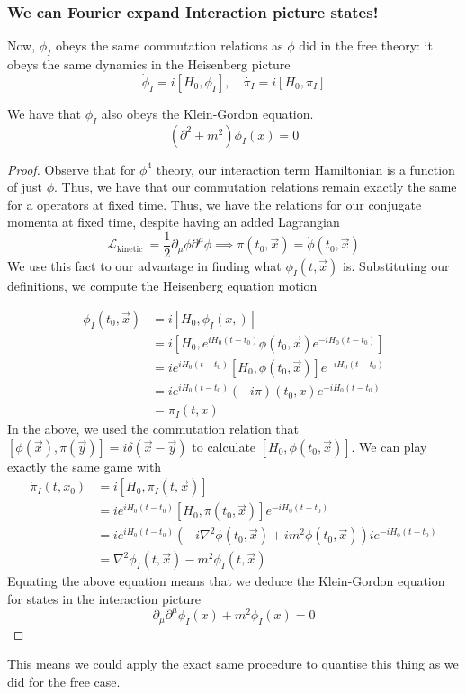 \subsubsection{We can Fourier expand Interaction picture states!} 
Now, $ \phi_ I $ obeys the same commutation relations
as $ \phi $ did in the free theory: it obeys the same dynamics 
in the Heisenberg picture
\[
\dot{ \phi} _ I  = i [ H_0 , \phi_I ], \quad \dot{ \pi_I } = i [ H_0 , \pi_I]  
\] 
\begin{thm}
We have that $ \phi_ I $ also obeys the Klein-Gordon equation. 
\[
( \partial  ^ 2 + m ^ 2 ) \phi_ I ( x) = 0 
\]
\begin{proof}
Observe that for $ \phi ^ 4 $ theory, our interaction term Hamiltonian 
is a function of just $ \phi $. Thus, we have that our commutation relations remain 
exactly the same for a operators at fixed time. Thus, we have the relations for 
our conjugate momenta at fixed time, despite having an added Lagrangian
\[	
\mathcal{ L }_{\text{kinetic }}  = \frac{1}{2 } \partial _\mu \phi \partial  ^\mu \phi \implies \pi ( t_0, \vec{x} )  = \dot{\phi } ( t_0 , \vec{x} )   
\] We use this fact to our advantage in finding what 
$ \phi _ I  ( t, \vec{x} ) $  is. 
Substituting our definitions, we compute the Heisenberg equation motion 

\begin{align*}
\dot{ \phi }_I ( t_0, \vec{x} ) &=  i [ H_0 , \phi_I ( x, ) ]  \\
&=  i [ H_0 , e^{ i H_0 ( t - t_0 )  } \phi ( t_0 , \vec{x} ) e^{ - i H_0 ( t - t_0 ) }]   \\
&= i e^{ i H_0 (  t- t_0 ) } [ H_0 , \phi ( t_0, \vec{x} )  ] e^{ - i H_0 ( t - t_0 ) } \\
&= i e^{ i H_0 ( t - t_0 ) } ( - i  \pi)  ( t_0 , x ) e^{  - i H_0 ( t - t_0 ) } \\
	&=   \pi_ I ( t, x )  
\end{align*} In the above, we used the commutation relation that 
$ [ \phi ( \vec{x} ) , \pi ( \vec{y} ) ] = i \delta ( \vec{x} - \vec{y} ) $ 
to calculate $ [ H_0 , \phi ( t_0 , \vec{x} ) ] $. 
We can play exactly the same game with 
\begin{align*}
\dot{ \pi} _I ( t, x_0 ) &=  i [ H_0 , \pi_I ( t , \vec{x} ) ]  \\
&=  i e^{ i H_0 (  t- t_0 ) } [ H_0 , \pi ( t_0, \vec{x} ) ] e^{  - i H_0 ( t - t_0 ) } \\
&=  i e^{ i H_0 ( t - t_0 ) } ( - i \nabla ^ 2 \phi ( t_0 , \vec{x} ) + i m ^ 2 \phi ( t_0 , \vec{x} ) ) i e ^{  - i H_0 ( t -t_0 ) }  \\
&=  \nabla ^2 \phi_ I ( t, \vec{x} ) - m ^ 2 \phi _ I ( t, \vec{x} ) 
\end{align*}
Equating the above equation means that we deduce the Klein-Gordon equation for states in the interaction 
picture
\[
\partial _\mu \partial  ^\mu \phi_ I ( x  ) + m ^ 2 \phi_I  ( x)  =0 
\] 
\end{proof}
\end{thm} This means we could apply the exact same procedure to 
quantise this thing as we did for the free case.


